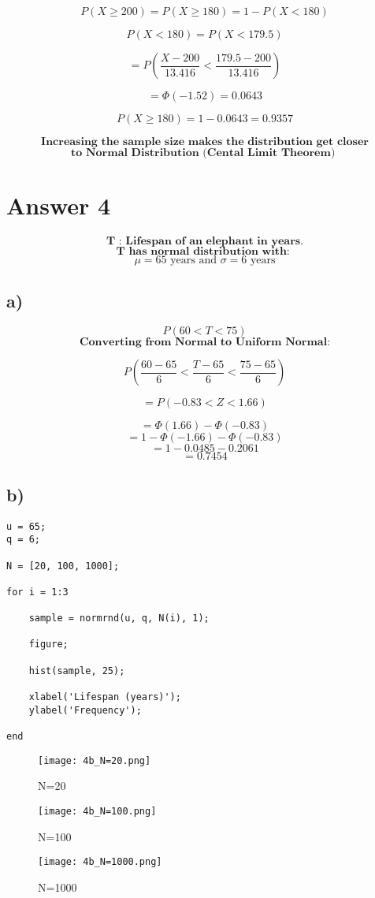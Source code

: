\documentclass[12pt]{article}
\begin{document}
\[ P(X \geq 200 ) = P(X \geq 180 ) = 1 - P( X < 180) \]

\[P(X<180) = P(X<179.5) \]

\[= P(\frac{X-200}{13.416} < \frac{179.5-200}{13.416}) \]

\[ = \Phi(-1.52) = 0.0643\]

\[P(X \geq 180) = 1 - 0.0643 = 0.9357 \]

\[\textbf{Increasing the sample size makes the distribution get closer}\]
\[\textbf{to Normal Distribution (Cental Limit Theorem) }\]


\section*{Answer 4}

\[\textbf{T : Lifespan of an elephant in years.}\]
\[\textbf{T has normal distribution with: }\]
\[ \mu = 65 \text{ years and } \sigma = 6 \text{ years}\]

\subsection*{a)}

\[ P(60<T<75) \]
\[ \textbf{Converting from Normal to Uniform Normal:} \]

\[ P(\frac{60-65}{6} < \frac{T-65}{6} < \frac{75-65}{6}) \]

\[ = P(-0.83 < Z < 1.66) \]

\[ = \Phi(1.66) - \Phi(-0.83) \]
\[ = 1 - \Phi(-1.66) - \Phi(-0.83) \]
\[= 1 - 0.0485 - 0.2061 \]
\[= 0.7454 \]

\subsection*{b)} 

\begin{lstlisting}
u = 65;
q = 6;

N = [20, 100, 1000];

for i = 1:3

    sample = normrnd(u, q, N(i), 1);
    
    figure;
    
    hist(sample, 25);
    
    xlabel('Lifespan (years)');
    ylabel('Frequency');
    
end
\end{lstlisting}

\begin{figure}
  \texttt{[image: 4b\_N=20.png]}
  \label{N=20}
  \caption{N=20}
\end{figure}

\begin{figure}
  \texttt{[image: 4b\_N=100.png]}
  \label{N=100}
  \caption{N=100}
\end{figure}

\begin{figure}
  \texttt{[image: 4b\_N=1000.png]}
  \label{N=1000}
  \caption{N=1000}
\end{figure}
\end{document}

